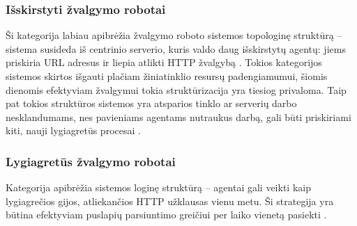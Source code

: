 \subsubsection{Išskirstyti žvalgymo robotai}

Ši kategorija labiau apibrėžia žvalgymo roboto sistemos topologinę struktūrą -- sistema susideda iš centrinio serverio, kuris valdo daug išskirstytų agentų: jiems priskiria URL adresus ir liepia atlikti HTTP žvalgybą \cite{CategoriesOfWebCrawlersAndOverview}. Tokios kategorijos sistemos skirtos išgauti plačiam žiniatinklio resursų padengiamumui, šiomis dienomis efektyviam žvalgymui tokia struktūrizacija yra tiesiog privaloma. Taip pat tokios struktūros sistemos yra atsparios tinklo ar serverių darbo nesklandumams, nes pavieniams agentams nutraukus darbą, gali būti priskiriami kiti, nauji lygiagretūs procesai \cite{CategoriesOfWebCrawlersAndOverview}.

\subsubsection{Lygiagretūs žvalgymo robotai}

Kategorija apibrėžia sistemos loginę struktūrą -- agentai gali veikti kaip lygiagrečios gijos, atliekančios HTTP užklausas vienu metu. Ši strategija yra būtina efektyviam puslapių parsiuntimo greičiui per laiko vienetą pasiekti \cite{CategoriesOfWebCrawlersAndOverview}.